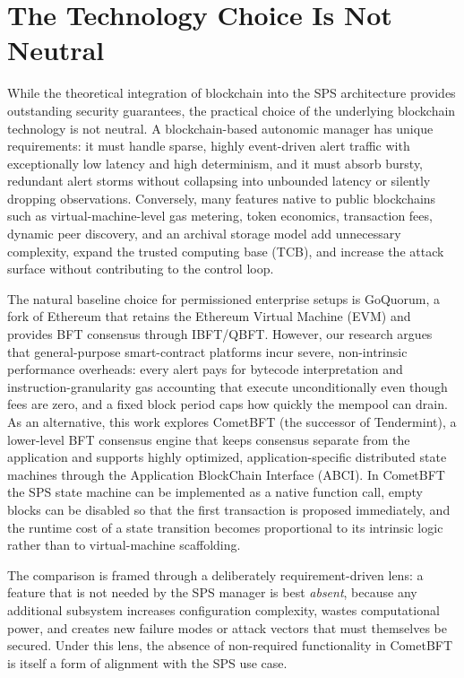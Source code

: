 \section{The Technology Choice Is Not Neutral}
\label{sec:intro_tech_choice}

While the theoretical integration of blockchain into the SPS architecture provides outstanding security guarantees, the practical choice of the underlying blockchain technology is not neutral. A blockchain-based autonomic manager has unique requirements: it must handle sparse, highly event-driven alert traffic with exceptionally low latency and high determinism, and it must absorb bursty, redundant alert storms without collapsing into unbounded latency or silently dropping observations. Conversely, many features native to public blockchains such as virtual-machine-level gas metering, token economics, transaction fees, dynamic peer discovery, and an archival storage model add unnecessary complexity, expand the trusted computing base (TCB), and increase the attack surface without contributing to the control loop.

The natural baseline choice for permissioned enterprise setups is GoQuorum, a fork of Ethereum that retains the Ethereum Virtual Machine (EVM) and provides BFT consensus through IBFT/QBFT. However, our research argues that general-purpose smart-contract platforms incur severe, non-intrinsic performance overheads: every alert pays for bytecode interpretation and instruction-granularity gas accounting that execute unconditionally even though fees are zero, and a fixed block period caps how quickly the mempool can drain. As an alternative, this work explores CometBFT (the successor of Tendermint), a lower-level BFT consensus engine that keeps consensus separate from the application and supports highly optimized, application-specific distributed state machines through the Application BlockChain Interface (ABCI). In CometBFT the SPS state machine can be implemented as a native function call, empty blocks can be disabled so that the first transaction is proposed immediately, and the runtime cost of a state transition becomes proportional to its intrinsic logic rather than to virtual-machine scaffolding.

The comparison is framed through a deliberately requirement-driven lens: a feature that is not needed by the SPS manager is best \emph{absent}, because any additional subsystem increases configuration complexity, wastes computational power, and creates new failure modes or attack vectors that must themselves be secured. Under this lens, the absence of non-required functionality in CometBFT is itself a form of alignment with the SPS use case.

